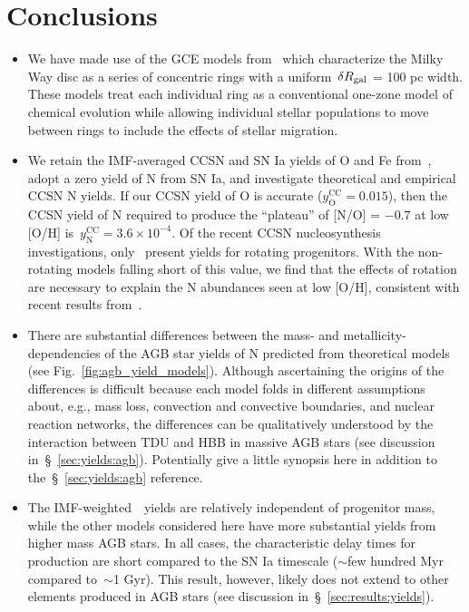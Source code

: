 \documentclass[ms.tex]{subfiles}
\begin{document}
 

\section{Conclusions} 
\label{sec:conclusions} 

\begin{itemize} 
	\item We have made use of the GCE models from~\citet{Johnson2021} which 
	characterize the Milky Way disc as a series of concentric rings with a 
	uniform~$\delta R_\text{gal}$ = 100 pc width. 
	These models treat each individual ring as a conventional one-zone model 
	of chemical evolution while allowing individual stellar populations to move 
	between rings to include the effects of stellar migration. 

	\item We retain the IMF-averaged CCSN and SN Ia yields of O and Fe 
	from~\citet{Johnson2021}, adopt a zero yield of N from SN Ia, and 
	investigate theoretical and empirical CCSN N yields. 
	If our CCSN yield of O is accurate ($y_\text{O}^\text{CC} = 0.015$), then 
	the CCSN yield of N required to produce the ``plateau'' of [N/O] = $-0.7$ 
	at low [O/H] is~$y_\text{N}^\text{CC} = 3.6\times10^{-4}$. 
	Of the recent CCSN nucleosynthesis investigations, only~\citet{Limongi2018} 
	present yields for rotating progenitors. 
	With the non-rotating models falling short of this value, we find that the 
	effects of rotation are necessary to explain the N abundances seen at low 
	[O/H], consistent with recent results from~\citet{Grisoni2021}. 

	\item There are substantial differences between the mass- and 
	metallicity-dependencies of the AGB star yields of N predicted from 
	theoretical models (see Fig.~\ref{fig:agb_yield_models}). 
	Although ascertaining the origins of the differences is difficult because 
	each model folds in different assumptions about, e.g., mass loss, 
	convection and convective boundaries, and nuclear reaction networks, the 
	differences can be qualitatively understood by the interaction between 
	TDU and HBB in massive AGB stars (see discussion 
	in~\S~\ref{sec:yields:agb}). 
	{\color{red} 
	Potentially give a little synopsis here in addition to 
	the~\S~\ref{sec:yields:agb} reference. 
	} 

	\item The IMF-weighted~\cristallo~yields are relatively independent of 
	progenitor mass, while the other models considered here have more 
	substantial yields from higher mass AGB stars. 
	In all cases, the characteristic delay times for production are short 
	compared to the SN Ia timescale ($\sim$few hundred Myr compared to~$\sim$1 
	Gyr). 
	This result, however, likely does not extend to other elements produced in
	AGB stars (see discussion in~\S~\ref{sec:results:yields}).


\end{itemize}
\end{document}
